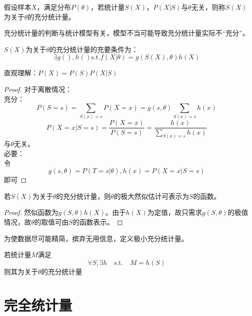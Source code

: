 \begin{definition}[充分统计量]
	假设样本$X$，满足分布$P(\theta)$，若统计量$S(X)$，$P(X|S)$与$\theta$无关，则称$S(X)$为关于$\theta$的充分统计量。
\end{definition}

\begin{remark}
	充分统计量的判断与统计模型有关，模型不当可能导致充分统计量实际不“充分”。
\end{remark}

\begin{theorem}[分解定理]
	$S(X)$为关于$\theta$的充分统计量的充要条件为：
	$$\exists g(),h() \text{s.t.} f(X|\theta)=g(S(X),\theta)h(X)$$
\end{theorem}

\begin{remark}
	直观理解：$P(X)=P(S)P(X|S)$
\end{remark}

\begin{proof}
	对于离散情况：\\
	充分：
	$$P(S=s)=\sum_{S(x)=s}P(X=x)=g(s,\theta)\sum_{S(x)=s}h(x)$$
	$$P(X=x|S=s)=\frac{P(X=x)}{P(S=s)}=\frac{h(x)}{\sum_{S(x)=s}h(x)}$$
	与$\theta$无关。\\
	必要：\\
	令$$g(s,\theta)=P(T=s|\theta),h(x)=P(X=x|S=s)$$即可
\end{proof}

\begin{theorem}
	若$S(X)$为关于$\theta$的充分统计量，则$\theta$的极⼤然似估计可表示为$S$的函数。
\end{theorem}

\begin{proof}
	然似函数为$g(S,\theta)h(X)$。由于$h(X)$为定值，故只需求$g(S,\theta)$的极值情况，故$\theta$的取值可由$S$的函数表示。
\end{proof}

为使数据尽可能精简，摈弃无用信息，定义极小充分统计量。

\begin{definition}[极小充分统计量]
	若统计量$M$满足
	$$\forall S, \exists h  \quad \text{s.t.} \quad
	 M=h(S) $$
	则其为关于$\theta$的充分统计量
\end{definition}

\section{完全统计量}

